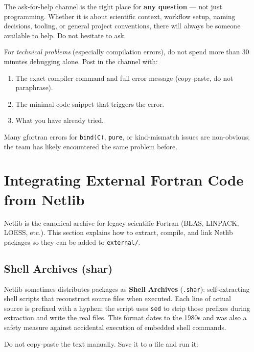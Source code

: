 \documentclass{article}
\begin{document}
The ask-for-help channel is the right place for \textbf{any question} — not just programming. Whether it is about scientific context, workflow setup, naming decisions, tooling, or general project conventions, there will always be someone available to help. Do not hesitate to ask.

For \emph{technical problems} (especially compilation errors), do not spend more than 30 minutes debugging alone. Post in the channel with:

\begin{enumerate}
  \item The exact compiler command and full error message (copy-paste, do not paraphrase).
  \item The minimal code snippet that triggers the error.
  \item What you have already tried.
\end{enumerate}

Many gfortran errors for \texttt{bind(C)}, \texttt{pure}, or kind-mismatch issues are non-obvious; the team has likely encountered the same problem before.

\section{Integrating External Fortran Code from Netlib}

Netlib is the canonical archive for legacy scientific Fortran (BLAS, LINPACK, LOESS, etc.). This section explains how to extract, compile, and link Netlib packages so they can be added to \texttt{external/}.

\subsection{Shell Archives (shar)}

Netlib sometimes distributes packages as \textbf{Shell Archives} (\texttt{.shar}): self-extracting shell scripts that reconstruct source files when executed. Each line of actual source is prefixed with a hyphen; the script uses \texttt{sed} to strip those prefixes during extraction and write the real files. This format dates to the 1980s and was also a safety measure against accidental execution of embedded shell commands.

Do not copy-paste the text manually. Save it to a file and run it:
\end{document}

